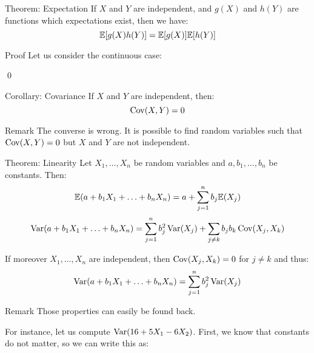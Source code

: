 \documentclass[a4paper]{article}
\begin{document}
\begin{parag}{Theorem: Expectation}
    If $X$ and $Y$ are independent, and $g\left(X\right)$ and $h\left(Y\right)$ are functions which expectations exist, then we have: 
    \[\exval\left[g\left(X\right)h\left(Y\right)\right] = \exval\left[g\left(X\right)\right]\exval\left[h\left(Y\right)\right]\]
    
    \begin{subparag}{Proof}
        Let us consider the continuous case: 
        
        \qed
    \end{subparag}
\end{parag}

\begin{parag}{Corollary: Covariance}
    If $X$ and $Y$ are independent, then: 
    \[\Cov\left(X, Y\right) = 0\]
    
    \begin{subparag}{Remark}
        The converse is wrong. It is possible to find random variables such that $\Cov\left(X, Y\right) = 0$ but $X$ and $Y$ are not independent.
    \end{subparag}
\end{parag}

\begin{parag}{Theorem: Linearity}
    Let $X_1, \ldots, X_n$ be random variables and $a, b_1, \ldots, b_n$ be constants. Then: 
    \[\exval\left(a + b_1 X_1 + \ldots + b_n X_n\right) = a + \sum_{j=1}^{n} b_j \exval\left(X_j\right)\]
    \[\Var\left(a + b_1 X_1 + \ldots + b_n X_n\right) = \sum_{j=1}^{n} b_j^2\Var\left(X_j\right) + \sum_{j \neq k}^{} b_j b_k \Cov\left(X_j, X_k\right)\]

    If moreover $X_1, \ldots, X_n$ are independent, then $\Cov\left(X_j, X_k\right) = 0$ for $j \neq k$ and thus: 
    \[\Var\left(a + b_1 X_1 + \ldots + b_n X_n\right) = \sum_{j=1}^{n} b_j^2 \Var\left(X_j\right)\]
     
    \begin{subparag}{Remark}
        Those properties can easily be found back.

        For instance, let us compute $\Var\left(16 + 5X_1 -  6 X_2\right)$. First, we know that constants do not matter, so we can write this as: 
    \end{subparag}
\end{parag}
\end{document}
